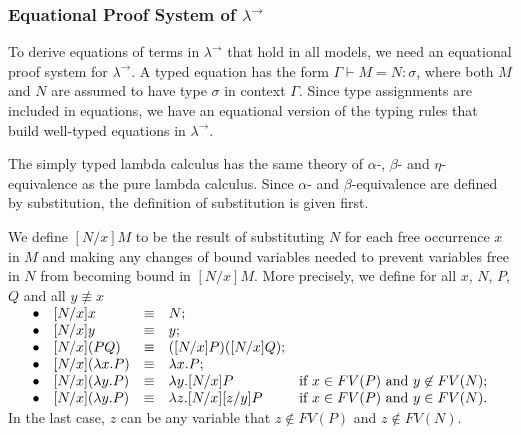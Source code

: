 \subsubsection{Equational Proof System of $ \lambda ^\to $}
\label{sec:bg_lc_eps}
To derive equations of terms in $ \lambda ^\to $ that hold in all models, we need an equational proof system for $ \lambda ^\to $. A typed equation has the form $ \Gamma \vdash M=N:\sigma $, where both $ M $ and $ N $ are assumed to have type $ \sigma $ in context $ \Gamma $. Since type assignments are included in equations, we have an equational version of the typing rules that build well-typed equations in $ \lambda ^\to $.

The simply typed lambda calculus has the same theory of $ \alpha $-, $ \beta $- and $ \eta $-equivalence as the pure lambda calculus. Since $ \alpha $- and $ \beta $-equivalence are defined by substitution, the definition of substitution is given first.

\begin{definition}
\label{definition:substitution}
We define $ [N/x]M $ to be the result of substituting $ N $ for each free occurrence $ x $ in $ M $ and making any changes of bound variables needed to prevent variables free in $ N $ from becoming bound in $ [N/x]M $. More precisely, we define for all $ x $, $ N $, $ P $, $ Q $ and all $ y \not\equiv x $\\
$
\begin{array}{rllll}
\hspace*{12pt} \bullet & [N/x]x & \equiv & N; & \\
\bullet & [N/x]y & \equiv & y; & \\
\bullet & [N/x](PQ) & \equiv & ([N/x]P)([N/x]Q); & \\
\bullet & [N/x](\lambda x.P) & \equiv & \lambda x.P; & \\
\bullet & [N/x](\lambda y.P) & \equiv & \lambda y.[N/x]P & \text{if } x \in FV(P) \text{ and } y \not\in FV(N); \\
\bullet & [N/x](\lambda y.P) & \equiv & \lambda z.[N/x][z/y]P & \text{if } x \in FV(P) \text{ and } y \in FV(N). \\
\end{array}
$\\
In the last case, $ z $ can be any variable that $ z \not\in FV(P) $ and $ z \not\in FV(N) $.
\end{definition}

